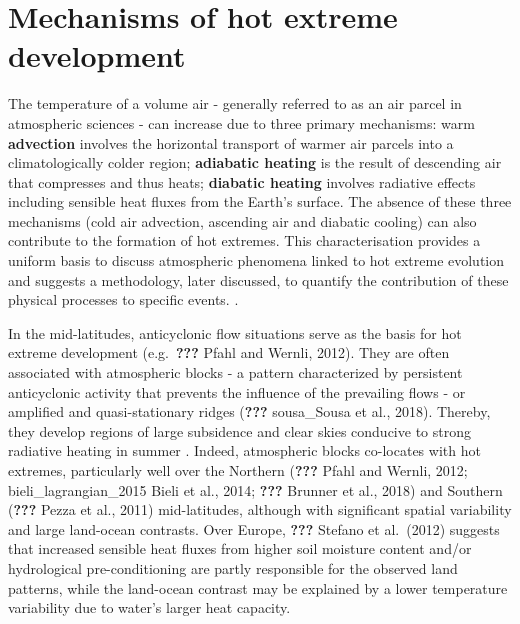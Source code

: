 \documentclass[11pt,a4paper,twoside,openright]{report}
\theoremstyle{definition}
\begin{document}
\section{Mechanisms of hot extreme development}\label{mechanisms-of-hot-extreme-development}

The temperature of a volume air - generally referred to as an air parcel in atmospheric sciences - can increase due to three primary mechanisms: warm \textbf{advection} involves the horizontal transport of warmer air parcels into a climatologically colder region; \textbf{adiabatic heating} is the result of descending air that compresses and thus heats; \textbf{diabatic heating} involves radiative effects including sensible heat fluxes from the Earth's surface. The absence of these three mechanisms (cold air advection, ascending air and diabatic cooling) can also contribute to the formation of hot extremes. This characterisation provides a uniform basis to discuss atmospheric phenomena linked to hot extreme evolution and suggests a methodology, later discussed, to quantify the contribution of these physical processes to specific events. .

In the mid-latitudes, anticyclonic flow situations serve as the basis for hot extreme development (e.g.~\textbf{???} Pfahl and Wernli, 2012). They are often associated with atmospheric blocks - a pattern characterized by persistent anticyclonic activity that prevents the influence of the prevailing flows \citep{lupo_atmospheric_2021} - or amplified and quasi-stationary ridges (\textbf{???} sousa\_Sousa et al., 2018). Thereby, they develop regions of large subsidence and clear skies conducive to strong radiative heating in summer \citep{lupo_atmospheric_2021}. Indeed, atmospheric blocks co-locates with hot extremes, particularly well over the Northern (\textbf{???} Pfahl and Wernli, 2012; bieli\_lagrangian\_2015 Bieli et al., 2014; \textbf{???} Brunner et al., 2018) and Southern (\textbf{???} Pezza et al., 2011) mid-latitudes, although with significant spatial variability and large land-ocean contrasts. Over Europe, \textbf{???} Stefano et al.~(2012) suggests that increased sensible heat fluxes from higher soil moisture content and/or hydrological pre-conditioning are partly responsible for the observed land patterns, while the land-ocean contrast may be explained by a lower temperature variability due to water's larger heat capacity.
\end{document}
